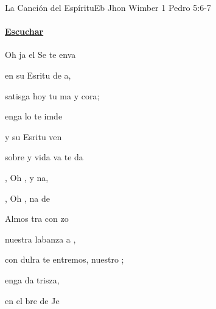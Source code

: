 \documentclass[12pt, spanish]{book}
\begin{document}
    \begin{song}{La Canción del Espíritu}{Eb}
        {} %
        {Jhon Wimber}
        {1 Pedro 5:6-7} %
        {}
        \ifChordBk
        \paragraph{\mbox{}\hfill\protect\href{https://open.spotify.com/intl-es/track/5tKpXmVMPetlH4ONsBwSf8}{Escuchar}\mbox{}\hfill}
        \fi


        \begin{SBOpGroup}
            Oh ja  el Se te enva

            en su Esritu de a,

            satisga hoy tu ma y cora;

            enga lo  te imde

            y su Esritu ven

            sobre  y vida va te da~
        \end{SBOpGroup}

        \begin{SBChorus}
            , Oh ,  y na,~

            , Oh , na de 
        \end{SBChorus}

        \begin{SBOpGroup}
            Almos tra  con zo

            nuestra labanza a ,

            con dulra te entremos, nuestro ;

            enga da  trisza,

            en el bre de Je


\end{SBOpGroup}
\end{song}
\end{document}
